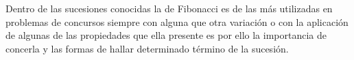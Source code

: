Dentro de las sucesiones conocidas la de Fibonacci es de las más utilizadas en  problemas de concursos siempre con alguna que otra variación o con la aplicación de algunas de las propiedades que ella presente es por ello la importancia de concerla y las formas de hallar determinado término de la sucesión. 